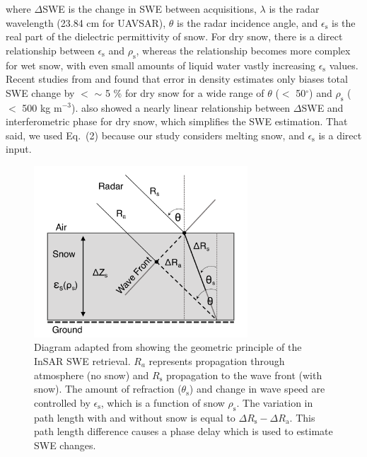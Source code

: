 where $\Delta$SWE is the change in SWE between acquisitions, $\lambda$ is the radar wavelength (23.84 cm for UAVSAR), $\theta$ is the radar incidence angle, and $\epsilon_\mathrm{s}$ is the real part of the dielectric permittivity of snow. For dry snow, there is a direct relationship between $\epsilon_\mathrm{s}$ and $\rho_\mathrm{s}$, whereas the relationship becomes more complex for wet snow, with even small amounts of liquid water vastly increasing $\epsilon_\mathrm{s}$ values. Recent studies from \citet{epplerSnowWaterEquivalent2022} and \citet{leinssSnowWaterEquivalent2015} found that error in density estimates only biases total SWE change by $<$ $\sim$ 5 \% for dry snow for a wide range of $\theta$ ($<$ 50$^{\circ}$) and $\rho_\mathrm{s}$ ($<$ 500 kg m$^{-3}$). \citet{leinssSnowWaterEquivalent2015} also showed a nearly linear relationship between $\Delta$SWE and interferometric phase for dry snow, which simplifies the SWE estimation. That said, we used Eq.~(2) because our study considers melting snow, and $\epsilon_\mathrm{s}$ is a direct input. \par

\begin{figure}[t]
\centering\includegraphics[width=8cm]{figures/ch3_figs/fig01.pdf}
\caption{Diagram adapted from \citet{leinssSnowWaterEquivalent2015} showing the geometric principle of the InSAR SWE retrieval. $R_a$ represents propagation through atmosphere (no snow) and $R_\mathrm{s}$ propagation to the wave front (with snow). The amount of refraction ($\theta_\mathrm{s}$) and change in wave speed are controlled by $\epsilon_\mathrm{s}$, which is a function of snow $\rho_\mathrm{s}$. The variation in path length with and without snow is equal to $\Delta R_\mathrm{s} - \Delta R_\mathrm{a}$. This path length difference causes a phase delay which is used to estimate SWE changes.}
\end{figure}

